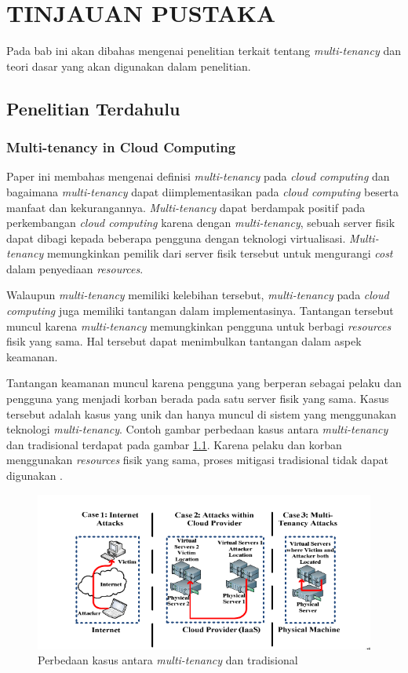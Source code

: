 \chapter{TINJAUAN PUSTAKA}

Pada bab ini akan dibahas mengenai penelitian terkait tentang \emph{multi-tenancy}
dan teori dasar yang akan digunakan dalam penelitian.

\section{Penelitian Terdahulu}

\subsection{Multi-tenancy in Cloud Computing}

Paper ini membahas mengenai definisi \emph{multi-tenancy} pada \emph{cloud computing}
dan bagaimana \emph{multi-tenancy} dapat diimplementasikan pada \emph{cloud computing} beserta
manfaat dan kekurangannya. \emph{Multi-tenancy} dapat berdampak positif pada perkembangan
\emph{cloud computing} karena dengan \emph{multi-tenancy}, sebuah server fisik dapat
dibagi kepada beberapa pengguna dengan teknologi virtualisasi. \emph{Multi-tenancy} memungkinkan
pemilik dari server fisik tersebut untuk mengurangi \emph{cost} dalam penyediaan
\emph{resources}.

Walaupun \emph{multi-tenancy} memiliki kelebihan tersebut,
\emph{multi-tenancy} pada \emph{cloud computing} juga memiliki tantangan dalam
implementasinya. Tantangan tersebut muncul karena \emph{multi-tenancy} memungkinkan
pengguna untuk berbagi \emph{resources} fisik yang sama. Hal tersebut dapat menimbulkan
tantangan dalam aspek keamanan.

Tantangan keamanan muncul karena pengguna yang berperan sebagai pelaku dan pengguna
yang menjadi korban berada pada satu server fisik yang sama. Kasus tersebut adalah
kasus yang unik dan hanya muncul di sistem yang menggunakan teknologi \emph{multi-tenancy}.
Contoh gambar perbedaan kasus antara \emph{multi-tenancy} dan tradisional terdapat pada
gambar \ref{fig:MultiTenancyCase}. Karena pelaku dan korban menggunakan \emph{resources}
fisik yang sama, proses mitigasi tradisional tidak dapat digunakan \parencite{6830928}.

\begin{figure} [H] \centering
  \includegraphics[scale=0.6]{gambar/multi-tenancy-case.png}
  \caption{Perbedaan kasus antara \emph{multi-tenancy} dan tradisional}
  \label{fig:MultiTenancyCase}
\end{figure}

